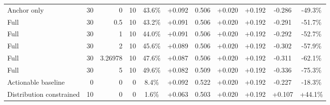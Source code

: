 \begin{table}[htbp]
\begin{tabular}{lrrrccccccc}
Anchor only & 30 & 0 & 10 & 43.6\% & +0.092 & 0.506 & +0.020 & +0.192 & -0.286 & -49.3\% \\
Full & 30 & 0.5 & 10 & 43.2\% & +0.091 & 0.506 & +0.020 & +0.192 & -0.291 & -51.7\% \\
Full & 30 & 1 & 10 & 44.0\% & +0.091 & 0.506 & +0.020 & +0.192 & -0.292 & -52.7\% \\
Full & 30 & 2 & 10 & 45.6\% & +0.089 & 0.506 & +0.020 & +0.192 & -0.302 & -57.9\% \\
Full & 30 & 3.26978 & 10 & 47.6\% & +0.087 & 0.506 & +0.020 & +0.192 & -0.311 & -62.1\% \\
Full & 30 & 5 & 10 & 49.6\% & +0.082 & 0.509 & +0.020 & +0.192 & -0.336 & -75.3\% \\
Actionable baseline & 0 & 0 & 0 & 8.4\% & +0.092 & 0.522 & +0.020 & +0.192 & -0.227 & -18.3\% \\
Distribution constrained & 10 & 0 & 0 & 1.6\% & +0.063 & 0.503 & +0.020 & +0.192 & +0.107 & +44.1\% \\
\bottomrule
\end{tabular}
\end{table}